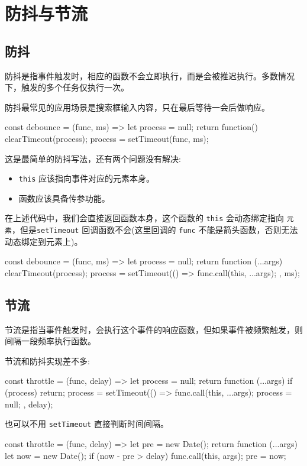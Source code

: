 \section{防抖与节流}

\subsection{防抖}

防抖是指事件触发时，相应的函数不会立即执行，而是会被推迟执行。多数情况下，触发的多个任务仅执行一次。

防抖最常见的应用场景是搜索框输入内容，只在最后等待一会后做响应。

\begin{JavaScript}
const debounce = (func, ms) => {
  let process = null;
  return function() {
    clearTimeout(process);
    process = setTimeout(func, ms);
  }
}
\end{JavaScript}

这是最简单的防抖写法，还有两个问题没有解决:
\begin{itemize}
  \item \texttt{this} 应该指向事件对应的元素本身。
  \item 函数应该具备传参功能。
\end{itemize}

在上述代码中，我们会直接返回函数本身，这个函数的 \texttt{this} 会动态绑定指向 \texttt{元素}，但是\texttt{setTimeout} 回调函数不会(这里回调的 \texttt{func} 不能是箭头函数，否则无法动态绑定到元素上)。

\begin{JavaScript}
const debounce = (func, ms) => {
  let process = null;
  return function (...args) {
    clearTimeout(process);
    process = setTimeout(() => {
      func.call(this, ...args);
    }, ms);
  }
}
\end{JavaScript}

\subsection{节流}

节流是指当事件触发时，会执行这个事件的响应函数，但如果事件被频繁触发，则间隔一段频率执行函数。

节流和防抖实现差不多:
\begin{JavaScript}
const throttle = (func, delay) => {
  let process = null;
  return function (...args) {
    if (process)
    return;
    process = setTimeout(() => {
      func.call(this, ...args);
      process = null;
    }, delay);
  }
}
\end{JavaScript}

也可以不用 \texttt{setTimeout} 直接判断时间间隔。

\begin{JavaScript}
const throttle = (func, delay) => {
  let pre = new Date();
  return function (...args) {
    let now = new Date();
    if (now - pre > delay) {
      func.call(this, args);
      pre = now;
    }
  }
}
\end{JavaScript}